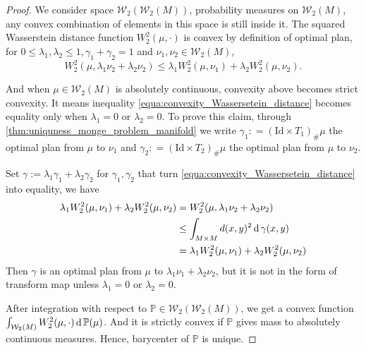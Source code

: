 \begin{proof}
	We consider space $\mathcal{W}_2(\mathcal{W}_2(M))$, probability measures on $\mathcal{W}_2(M)$,
	any convex combination of elements in this space is still inside it.
	The squared Wasserstein distance function $W^2_2(\mu, \cdot)$ is convex by definition of optimal plan,
	for $0 \leq \lambda_1, \lambda_2 \leq 1, \gamma_1 + \gamma_2 =1 $ and $ \nu_1,\nu_2 \in \mathcal{W}_2(M)$,
	\begin{equation}
		\label{equa:convexity_Wassersetein_distance}
		W_2^2(\mu, \lambda_1 \nu_2 + \lambda_2 \nu_2) \leq \lambda_1 W_2^2(\mu, \nu_1) + \lambda_2 W_2^2(\mu, \nu_2).
	\end{equation}

	And when $\mu \in \mathcal{W}_2(M)$ is absolutely continuous, convexity above becomes strict convexity.
	It means inequality \cref{equa:convexity_Wassersetein_distance} becomes equality only when
	$\lambda_1=0$ or $\lambda_2=0$.
	To prove this claim,
	through \cref{thm:uniquness_monge_problem_manifold} we write
	$\gamma_1 : = (\text{Id}  \times T_1)_{\#}\mu$ the optimal plan from $\mu$ to $\nu_1$ and
	$\gamma_2 : = (\text{Id}  \times T_2)_{\#}\mu$ the optimal plan from $\mu$ to $\nu_2$.

	Set $\gamma := \lambda_1 \gamma_1 + \lambda_2 \gamma_2$ for $\gamma_1, \gamma_2$ that turn
	\cref{equa:convexity_Wassersetein_distance} into equality,
	we have
	\begin{align*}
		\lambda_1 W_2^2(\mu, \nu_1) + \lambda_2 W_2^2(\mu, \nu_2) & = W_2^2(\mu, \lambda_1 \nu_2 + \lambda_2 \nu_2)            \\
																															& \leq \int_{M \times M} d(x,y)^2 \operatorname{d} \gamma(x,y)                    \\
		                                                          & =	\lambda_1 W_2^2(\mu, \nu_1) + \lambda_2 W_2^2(\mu, \nu_2)
	\end{align*}
	Then $\gamma$ is an optimal plan from $ \mu$ to $\lambda_1 \nu_1 + \lambda_2 \nu_2$,
	but it is not in the form of transform map unless $\lambda_1 =0$ or $\lambda_2 =0$.

	After integration with respect to $\mathbb{P} \in \mathcal{W}_2(\mathcal{W}_2(M))$,
	we get a convex function $\int_{\mathcal{W}_2(M)} W_2^2(\mu, \cdot) \operatorname{d} \mathbb{P}(\mu)$.
	And it is strictly convex if $\mathbb{P}$ gives mass to absolutely continuous measures.
	Hence, barycenter of $\mathbb{P}$ is unique.
\end{proof}

